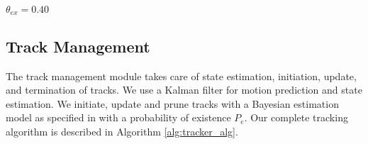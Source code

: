 \documentclass[letterpaper, 10 pt, conference]{ieeeconf}
\begin{document}
\begin{algorithm}[ht]
\SetAlgoLined
 $\theta_{ex}=0.40$ 
\end{algorithm}
\subsection{Track Management}
The track management module takes care of state estimation, initiation, update, and termination of tracks. We use a Kalman filter for motion prediction and state estimation. We initiate, update and prune tracks with a Bayesian estimation model as specified in \cite{Pak2016JointTD} with a probability of existence $P_{e}$. Our complete tracking algorithm is described in Algorithm \ref{alg:tracker_alg}.
\end{document}
